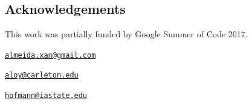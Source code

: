

\subsection{Acknowledgements}\label{acknowledgements}

This work was partially funded by Google Summer of Code 2017.

\address{%
Alexandre Almeida\\
University of Campinas\\
Institute of Computing\\ Campinas, Brazil 13083-852\\
}
\href{mailto:almeida.xan@gmail.com}{\nolinkurl{almeida.xan@gmail.com}}

\address{%
Adam Loy\\
Carleton College\\
Department of Mathematics and Statistics\\ Northfield, MN 55057\\
}
\href{mailto:aloy@carleton.edu}{\nolinkurl{aloy@carleton.edu}}

\address{%
Heike Hofmann\\
Iowa State University\\
Department of Statistics\\ Ames, IA 50011-1210\\
}
\href{mailto:hofmann@iastate.edu}{\nolinkurl{hofmann@iastate.edu}}

